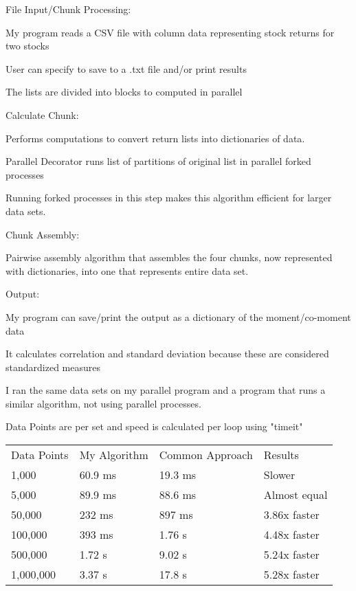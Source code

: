 \documentclass{beamer}
\begin{document}
\begin{frame}
File Input/Chunk Processing:

\textbullet My program reads a CSV file with column data representing stock returns for two stocks

\textbullet User can specify to save to a .txt file and/or print results

\textbullet The lists are divided into blocks to computed in parallel
\end{frame}


\begin{frame}
Calculate Chunk:

\textbullet Performs computations to convert return lists into dictionaries of data.

\textbullet Parallel Decorator runs list of partitions of original list in parallel forked processes

\textbullet Running forked processes in this step makes this algorithm efficient for larger data sets.

\vspace{1cm}
Chunk Assembly:

\textbullet Pairwise assembly algorithm that assembles the four chunks, now represented with dictionaries, into one that represents entire data set.

\end{frame}

\begin{frame}
Output:

\textbullet My program can save/print the output as a dictionary of the moment/co-moment data

\textbullet It calculates correlation and standard deviation because these are considered standardized measures

\end{frame}

\begin{frame}
I ran the same data sets on my parallel program and a program that runs a similar algorithm, not using parallel processes.

Data Points are per set and speed is calculated per loop using "timeit"
\begin{table}[h]
\begin{tabular}{llll}
Data Points& My Algorithm & Common Approach & Results \\
1,000 & 60.9 ms& 19.3 ms & Slower \\
5,000 & 89.9 ms& 88.6 ms & Almost equal \\
50,000 & 232 ms& 897 ms & 3.86x faster \\
100,000 & 393 ms& 1.76 s & 4.48x faster \\
500,000 & 1.72 s& 9.02 s & 5.24x faster \\
1,000,000 & 3.37 s& 17.8 s & 5.28x faster
\end{tabular}
\end{table}
\end{frame}
\end{document}
